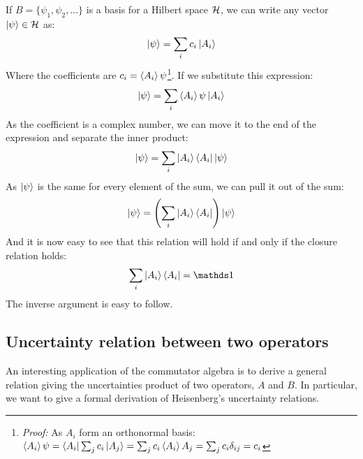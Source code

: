 If $B = \{\psi_1, \psi_2, ...\}$ is a basis for a Hilbert space $\mathcal{H}$, we can write any vector $\ket{\psi}\in\mathcal{H}$ as:
\begin{equation}
    \ket{\psi} = \sum_i c_i\ket{A_i}
\end{equation}
Where the coefficients are $c_i = \braket{A_i}{\psi}$\footnote{\textit{Proof:} As $A_i$ form an orthonormal basis: $\braket{A_i}{\psi} = \bra{A_i}\sum_jc_i\ket{A_j} = \sum_jc_i\braket{A_i}{A_j} = \sum_jc_i\delta_{ij} = c_i$}. If we substitute this expression:
\begin{equation}
    \ket{\psi} = \sum_i \braket{A_i}{\psi}\ket{A_i}
\end{equation}
As the coefficient is a complex number, we can move it to the end of the expression and separate the inner product:
\begin{equation}
    \ket{\psi} = \sum_i \ket{A_i}\bra{A_i}\ket{\psi}
\end{equation}
As $\ket{\psi}$ is the same for every element of the sum, we can pull it out of the sum:
\begin{equation}
    \ket{\psi} = \left(\sum_i \ket{A_i}\bra{A_i}\right)\ket{\psi}
\end{equation}
And it is now easy to see that this relation will hold if and only if the closure relation holds:
\begin{equation}
    \sum_i \ket{A_i}\bra{A_i} = \Imat
\end{equation}
The inverse argument is easy to follow.

\subsection{Uncertainty relation between two operators} \label{uncertainty_relation}

An interesting application of the commutator algebra is to derive a general relation giving the uncertainties product of two operators, $A$ and $B$. In particular, we want to give a formal derivation of Heisenberg's uncertainty relations.
